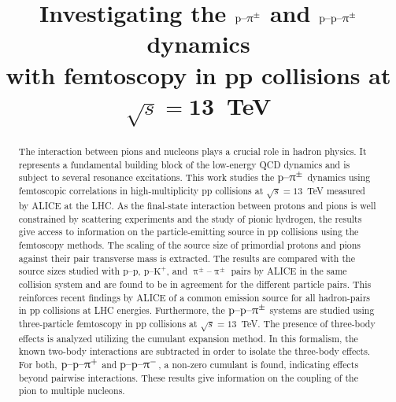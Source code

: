 \documentclass[ALICE,manyauthors]{cernphprep}
\begin{document}
\begin{titlepage}

\title{Investigating the $\mathbf{\text{p--}\uppi^\pm}$ and  $\mathbf{\text{p--p--}\uppi^\pm}$ dynamics \\ with femtoscopy in pp collisions at $\mathbf{\sqrt{\textit{s}}=13}$~TeV}


\begin{abstract}

 The interaction between pions and nucleons plays a crucial role in hadron physics. It represents a fundamental building block of the low-energy QCD dynamics and is subject to several resonance excitations. This work studies the $\text{p--}\uppi^\pm$ dynamics using femtoscopic correlations in high-multiplicity pp collisions at $\sqrt{s} = 13$~TeV measured by ALICE at the LHC. As the final-state interaction between protons and pions is well constrained by scattering experiments and the study of pionic hydrogen, the results give access to information on the particle-emitting source in pp collisions using the femtoscopy methods. The scaling of the source size of primordial protons and pions against their pair transverse mass is extracted. The results are compared with the source sizes studied with p--p, $\text{p--K}^+$, and $\uppi^\pm$--$\uppi^\pm$ pairs by ALICE in the same collision system and are found to be in agreement for the different particle pairs. This reinforces recent findings by ALICE of a common emission source for all hadron-pairs in pp collisions at LHC energies.
Furthermore, the $\text{p--p--}\uppi^\pm$ systems are studied using three-particle femtoscopy in pp collisions at $\sqrt{s} = 13$~TeV. The presence of three-body effects is analyzed utilizing the cumulant expansion method. In this formalism, the known two-body interactions are subtracted in order to isolate the three-body effects. For both, $\text{p--p--}\uppi^+$ and $\text{p--p--}\uppi^-$, a non-zero cumulant is found, indicating effects beyond pairwise interactions. These results give information on the coupling of the pion to multiple nucleons.

\end{abstract}
\end{titlepage}
\end{document}
